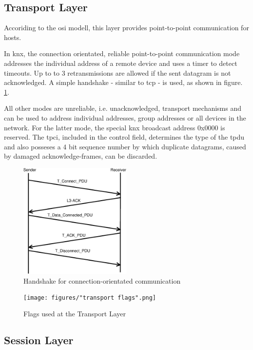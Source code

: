 \subsection{Transport Layer}

Accoriding to the \gls{osi} modell, this layer provides point-to-point communication for hosts.

In \gls{knx}, the connection orientated, reliable point-to-point communication mode addresses the individual address of a remote device and uses a timer to detect timeouts.
Up to to 3 retransmissions are allowed if the sent datagram is not acknowledged. A simple handshake - similar to \gls{tcp} - is used, as shown in figure. 
\ref{fig:handshake}.

All other modes are unreliable, i.e. unacknowledged, transport mechanisms and can be used to address individual addresses, group addresses or all devices in the
network. For the latter mode, the special \gls{knx} broadcast address 0x0000 is reserved. 
The \gls{tpci}, included in the control field, determines the type of the \gls{tpdu} and also posseses a 4 bit sequence number by which duplicate datagrams, caused by damaged 
acknowledge-frames, can be discarded.

 \begin{figure}
    \centering
    \includegraphics[width=0.5\textwidth]{figures/TransportHandshake.eps}
    \caption{Handshake for connection-orientated communication}
    \label{fig:handshake}
\end{figure}
 
\begin{figure}
    \centering
    \texttt{[image: figures/"transport flags".png]}
    \caption{Flags used at the Transport Layer}
    \label{fig:tFlags}
\end{figure}

\subsection{Session Layer}

